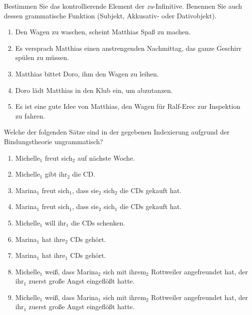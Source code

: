\Uebung \label{u138} Bestimmen Sie das kontrollierende Element der \textit{zu}-Infinitive.
Benennen Sie auch dessen grammatische Funktion (Subjekt, Akkusativ- oder Dativobjekt).

\begin{enumerate}\Lf
  \item Den Wagen zu waschen, scheint Matthias Spaß zu machen.
  \item Es versprach Matthias einen anstrengenden Nachmittag, das ganze Geschirr spülen zu müssen.
  \item Matthias bittet Doro, ihm den Wagen zu leihen.
  \item Doro lädt Matthias in den Klub ein, um abzutanzen.
  \item Es ist eine gute Idee von Matthias, den Wagen für Ralf-Erec zur Inspektion zu fahren.
\end{enumerate}

\Uebung \label{u139} Welche der folgenden Sätze sind in der gegebenen Indexierung aufgrund der Bindungstheorie ungrammatisch?

\begin{enumerate}\Lf
  \item Michelle$_{\textrm{1}}$ freut sich$_{\textrm{2}}$ auf nächste Woche.
  \item Michelle$_{\textrm{1}}$ gibt ihr$_{\textrm{2}}$ die CD.
  \item Marina$_{\textrm{1}}$ freut sich$_{\textrm{1}}$, dass sie$_{\textrm{2}}$ sich$_{\textrm{2}}$ die CDs gekauft hat.
  \item Marina$_{\textrm{1}}$ freut sich$_{\textrm{1}}$, dass sie$_{\textrm{2}}$ sich$_{\textrm{1}}$ die CDs gekauft hat.
  \item Michelle$_{\textrm{1}}$ will ihr$_{\textrm{1}}$ die CDs schenken.
  \item Marina$_{\textrm{1}}$ hat ihre$_{\textrm{2}}$ CDs gehört.
  \item Marina$_{\textrm{1}}$ hat ihre$_{\textrm{1}}$ CDs gehört.
  \item Michelle$_{\textrm{1}}$ weiß, dass Marina$_{\textrm{2}}$ sich mit ihrem$_{\textrm{2}}$ Rottweiler angefreundet hat, der ihr$_{\textrm{1}}$ zuerst große Angst eingeflößt hatte.
  \item Michelle$_{\textrm{1}}$ weiß, dass Marina$_{\textrm{1}}$ sich mit ihrem$_{\textrm{2}}$ Rottweiler angefreundet hat, der ihr$_{\textrm{1}}$ zuerst große Angst eingeflößt hatte.
\end{enumerate}

\WeitereLiteratur

